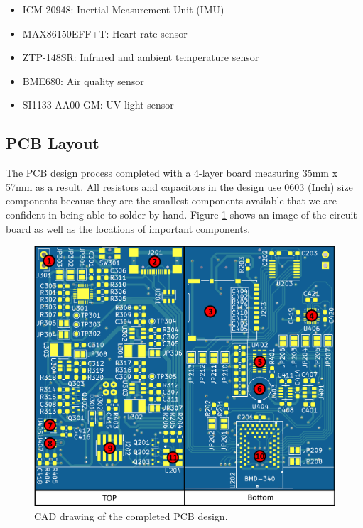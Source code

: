 \begin{itemize}
   \item ICM-20948: Inertial Measurement Unit (IMU)
   \item MAX86150EFF+T: Heart rate sensor
   \item ZTP-148SR: Infrared and ambient temperature sensor
   \item BME680: Air quality sensor
   \item SI1133-AA00-GM: UV light sensor
\end{itemize}

\subsection{PCB Layout}

The PCB design process completed with a 4-layer board measuring 35mm x 57mm as 
a result. All resistors and capacitors in the design use 0603 (Inch) size 
components because they are the smallest components available that we are
confident in being able to solder by hand. Figure \ref{fig:Board_TopBottom_Annotated}
shows an image of the circuit board as well as the locations of important 
components.

\begin{figure}[!htb]
\centering
\includegraphics[width=\textwidth]{images/Board_TopBottom_Annotated.png}
\caption{CAD drawing of the completed PCB design.}
\label{fig:Board_TopBottom_Annotated}
\end{figure}

